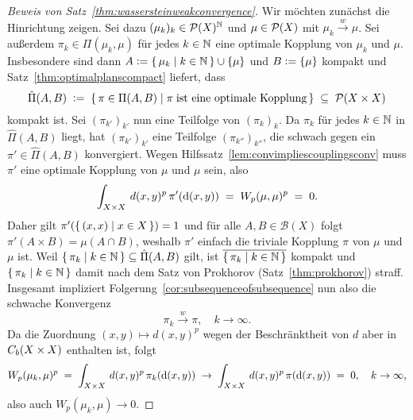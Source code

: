 \documentclass[../main/main.tex]{subfiles}
\begin{document}
	\begin{proof}[Beweis von Satz~\ref{thm:wassersteinweakconvergence}]
		Wir möchten zunächst die Hinrichtung zeigen. Sei dazu $(\mu_k)_k \in \mathcal{P}(X)^{\mathbb{N}}$ und $\mu \in \mathcal{P}(X)$ mit $\mu_k \xrightarrow{w} \mu$. Sei außerdem $\pi_k \in \Pi(\mu_k, \mu)$ 
		für jedes $k \in \mathbb{N}$ eine optimale Kopplung von $\mu_k$ und $\mu$. 
		Insbesondere sind dann $A \vcentcolon = \left\{\, \mu_k \; \middle| \; k \in \mathbb{N} \,\right\} \cup \left\{\mu\right\}$ und $B \vcentcolon = \left\{\mu\right\}$ kompakt und Satz~\ref{thm:optimalplanscompact} 
		liefert, dass 
		\[ \hat{\Pi}(A, B) \; \vcentcolon = \; \left\{\, \pi \in \Pi(A, B) \; \middle| \; \pi \; \text{ist eine optimale Kopplung} \,\right\} \; \subseteq \; \mathcal{P}(X \times X) \]
		kompakt ist. 
		Sei $(\pi_{k'})_{k'}$ nun eine Teilfolge von $(\pi_k)_k$. Da $\pi_k$ für jedes $k \in \mathbb{N}$ in $\hat{\Pi}(A, B)$ liegt, hat $(\pi_{k'})_{k'}$ eine Teilfolge $(\pi_{k''})_{k''}$, 
		die schwach gegen ein $\pi' \in \hat{\Pi}(A, B)$ konvergiert. Wegen Hilfssatz~\ref{lem:convimpliescouplingsconv} muss $\pi'$ eine optimale Kopplung von $\mu$ und $\mu$ sein, also
		\[ \int_{X \times X} \, d(x, y)^p \, \pi'(\mathrm{d}(x, y)) \; = \; W_p(\mu, \mu)^p \; = \; 0 \text{.} \]
		Daher gilt $\pi'(\left\{\, (x, x) \; \middle| \; x \in X \,\right\}) = 1$ und für alle $A, B \in \mathcal{B}(X)$ folgt $\pi'(A \times B) = \mu(A \cap B)$, weshalb $\pi'$ einfach die 
		triviale Kopplung $\pi$ von $\mu$ und $\mu$ ist. Weil $\left\{\, \pi_k \; \middle| \; k \in \mathbb{N} \,\right\} \subseteq \hat{\Pi}(A, B)$ gilt, ist $\overline{\left\{\, \pi_k \; \middle| \; k \in \mathbb{N} \,\right\}}$ kompakt und $\left\{\, \pi_k \; \middle| \; k \in \mathbb{N} \,\right\}$ damit nach
		dem Satz von Prokhorov (Satz~\ref{thm:prokhorov}) straff. Insgesamt impliziert Folgerung~\ref{cor:subsequenceofsubsequence} nun also die schwache Konvergenz
		\[ \pi_k \xrightarrow{w} \pi, \quad k \to \infty \text{.} \] 
		Da die Zuordnung $(x, y) \mapsto d(x, y)^p$ wegen der Beschränktheit von $d$ aber in $C_b(X \times X)$ enthalten ist, folgt 
		\[ W_p(\mu_k, \mu)^p \; = \; \int_{X \times X} \, d(x, y)^p \, \pi_k(\mathrm{d}(x, y)) \; \to \; \int_{X \times X} \, d(x, y)^p \, \pi(\mathrm{d}(x, y)) \; = \; 0, \quad k \to \infty \text{,} \]
		also auch $W_p(\mu_k, \mu) \to 0$.
		

\end{proof}
\end{document}
